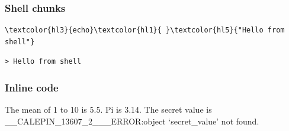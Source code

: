 \documentclass[11pt]{article}
\begin{document}
\subsubsection{Shell chunks}
\label{shell-chunks}




\begin{srccode}
\begin{Verbatim}[commandchars=\\\{\}]
\textcolor{hl3}{echo}\textcolor{hl1}{ }\textcolor{hl5}{"Hello from shell"}
\end{Verbatim}
\end{srccode}

\begin{outcode}
\begin{verbatim}
> Hello from shell
\end{verbatim}
\end{outcode}

\subsubsection{Inline code}
\label{inline-code}

The mean of 1 to 10 is 5.5. Pi is 3.14.
The secret value is \_\_CALEPIN\_13607\_2\_\_\_ERROR:object `secret\_value' not found.
\end{document}
